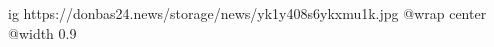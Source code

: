  
 
 
 
 

\ifcmt
  ig https://donbas24.news/storage/news/yk1y408s6ykxmu1k.jpg
  @wrap center
  @width 0.9
\fi
